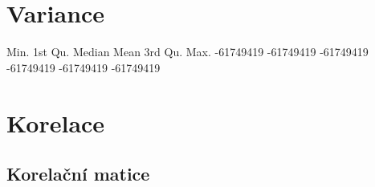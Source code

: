 \documentclass[a4paper, 12pt]{article}
\begin{document}
\clearpage
\section{Variance}
\begin{Schunk}
\begin{Soutput}
     Min.   1st Qu.    Median      Mean   3rd Qu.      Max. 
-61749419 -61749419 -61749419 -61749419 -61749419 -61749419 
\end{Soutput}
\end{Schunk}

\section{Korelace}
\subsection{Korelační matice}
\end{document}
